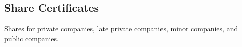 \documentclass{article}
\begin{document}
\begin{CJK}{UTF8}{min}















\subsection{Share Certificates}
Shares for private companies, late private companies, minor companies, and
public companies.


\end{CJK}
\end{document}
